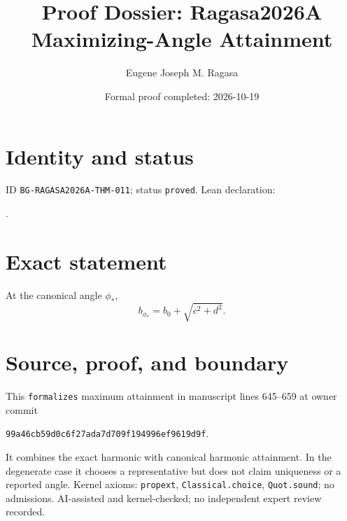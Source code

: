 \documentclass[11pt]{article}
\title{Proof Dossier: Ragasa2026A Maximizing-Angle Attainment}\author{Eugene Joseph M. Ragasa}\date{Formal proof completed: 2026-10-19}
\begin{document}
\maketitle
\section{Identity and status}
ID \texttt{BG-RAGASA2026A-THM-011}; status \texttt{proved}. Lean declaration:
\par{}.
\section{Exact statement}
At the canonical angle $\phi_*$,
\[b_{\phi_*}=b_0+\sqrt{c^2+d^2}.\]
\section{Source, proof, and boundary}
This \texttt{formalizes} maximum attainment in manuscript lines 645--659 at owner commit
\begin{center}\small\texttt{99a46cb59d0c6f27ada7d709f194996ef9619d9f}.\end{center}
It combines the exact harmonic with
canonical harmonic attainment. In the degenerate case it chooses a representative but
does not claim uniqueness or a reported angle. Kernel axioms: \texttt{propext},
\texttt{Classical.choice}, \texttt{Quot.sound}; no admissions. AI-assisted and
kernel-checked; no independent expert review recorded.
\end{document}
